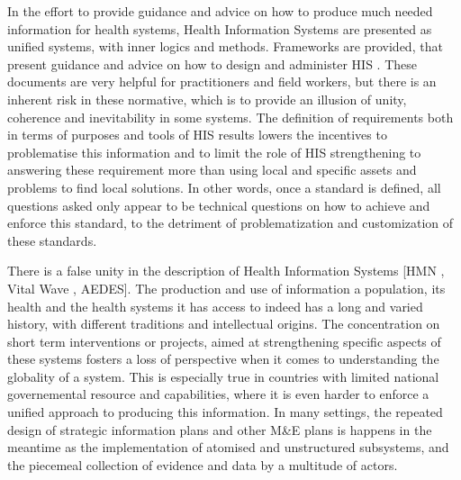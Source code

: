 




In the effort to provide guidance and advice on how to produce much needed information for health systems, Health Information Systems are presented as unified systems, with inner logics and methods. Frameworks are provided, that present guidance and advice on how to design and administer HIS \cite{health_metrics_network_framework_2008}. These documents are very helpful for practitioners and field workers, but there is an inherent risk in these normative, which is to provide an illusion of unity, coherence and inevitability in some systems. The definition of requirements both in terms of purposes and tools of HIS results lowers the incentives to problematise this information and to limit the role of HIS strengthening to answering these requirement more than using local and specific assets and problems to find local solutions. In other words, once a standard is defined, all questions asked only appear to be technical questions on how to achieve and enforce this standard, to the detriment of problematization and customization of these standards.%


There is a false unity in the description of Health Information Systems [HMN , Vital Wave , AEDES]. The production and use of information a population, its health and the health systems it has access to indeed has a long and varied history, with different traditions and intellectual origins. The concentration on short term interventions or projects, aimed at strengthening specific aspects of these systems fosters a loss of perspective when it comes to understanding the globality of a system. This is especially true in countries with limited national governemental resource and capabilities, where it is even harder to enforce a unified approach to producing this information. In many settings, the repeated design of strategic information plans and other M\&E plans is happens in the meantime as the implementation of atomised and unstructured subsystems, and the piecemeal collection of  evidence and data by a multitude of actors.

